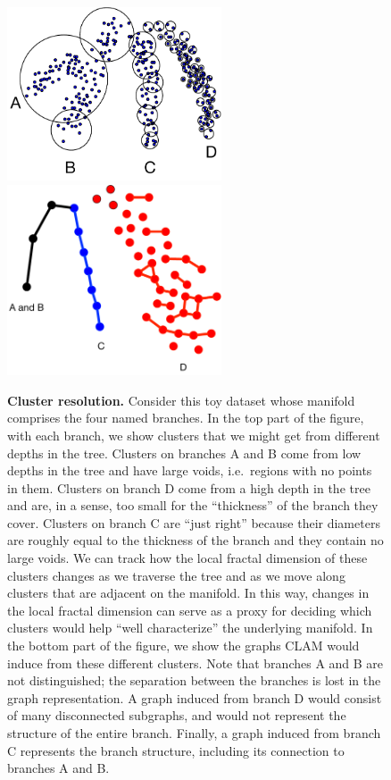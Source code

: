 \begin{figure}[ht!]
    \centering
    \includegraphics[width=2.5in]{images/cluster-resolution.pdf}\\
    \vspace{1cm}
    \includegraphics[width=2.5in]{images/cluster-resolution-graph.pdf}
    \caption{
        \textbf{Cluster resolution.}
        Consider this toy dataset whose manifold comprises the four named branches.
        In the top part of the figure, with each branch, we show clusters that we might get from different depths in the tree.
        Clusters on branches A and B come from low depths in the tree and have large voids, i.e.\ regions with no points in them.
        Clusters on branch D come from a high depth in the tree and are, in a sense, too small for the ``thickness'' of the branch they cover.
        Clusters on branch C are ``just right'' because their diameters are roughly equal to the thickness of the branch and they contain no large voids.
        We can track how the local fractal dimension of these clusters changes as we traverse the tree and as we move along clusters that are adjacent on the manifold.
        In this way, changes in the local fractal dimension can serve as a proxy for deciding which clusters would help ``well characterize'' the underlying manifold.
        In the bottom part of the figure, we show the graphs CLAM would induce from these different clusters.
        Note that branches A and B are not distinguished; the separation between the branches is lost in the graph representation.
        A graph induced from branch D would consist of many disconnected subgraphs, and would not represent the structure of the entire branch.
        Finally, a graph induced from branch C represents the branch structure, including its connection to branches A and B.
    }
    \label{fig:methods:cluster-resolution}
\end{figure}






